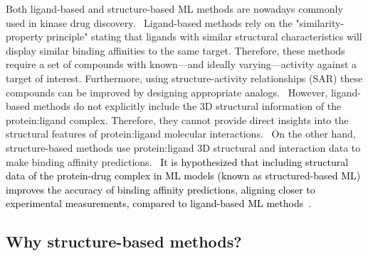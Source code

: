 \documentclass[9pt,lessons]{livecoms}
\newcommand{\revision}[1]{\textcolor{black}{#1}}
\begin{document}
Both ligand-based and structure-based ML methods are nowadays commonly used in kinase drug discovery.~\cite{sliwoski2014computational, abuhammad2016innovative, vazquez2020merging, liu2023hybrid, backenkohler2023guided, gorantla2023proteins}
Ligand-based methods rely on the "similarity-property principle" \cite{amendola2021pyrmd} stating that ligands with similar structural characteristics will display similar binding affinities to the same target. 
Therefore, these methods require a set of compounds with known---and ideally varying---activity against a target of interest. Furthermore, using structure-activity relationships (SAR) these compounds can be improved by designing appropriate analogs.~\cite{amendola2021pyrmd, chen2007evaluation, abuhammad2016innovative} %
However, ligand-based methods do not explicitly include the 3D structural information of the protein:ligand complex. Therefore, they cannot provide direct insights into the structural features of protein:ligand molecular interactions.~\cite{liu2023hybrid} On the other hand, structure-based methods use protein:ligand 3D structural and interaction data to make binding affinity predictions.~\cite{liu2023hybrid, schaller2023benchmarking} \revision{It is hypothesized that including structural data of the protein-drug complex in ML models (known as structured-based ML) improves the accuracy of binding affinity predictions, aligning closer to experimental measurements, compared to ligand-based ML methods}~\cite{schaller2023benchmarking, backenkohler2023guided}. 

\subsection{Why structure-based methods?}
\end{document}
